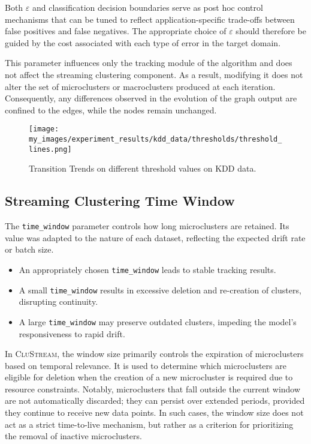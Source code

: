 Both $\varepsilon$ and classification decision boundaries serve as post hoc
control mechanisms that can be tuned to reflect application-specific trade-offs
between false positives and false negatives. The appropriate choice of
$\varepsilon$ should therefore be guided by the cost associated with each type of
error in the target domain.

This parameter influences only the tracking module of the algorithm and does
not affect the streaming clustering component. As a result, modifying it does
not alter the set of microclusters or macroclusters produced at each iteration.
Consequently, any differences observed in the evolution of the graph output are
confined to the edges, while the nodes remain unchanged.

\begin{figure}[H]
      \centering
      \texttt{[image: my\_images/experiment\_results/kdd\_data/thresholds/threshold\_lines.png]}
      \caption{Transition Trends on different threshold values on KDD data.}
\end{figure}

\subsection{Streaming Clustering Time Window}

The \texttt{time\_window} parameter controls how long microclusters are
retained. Its value was adapted to the nature of each dataset, reflecting the
expected drift rate or batch size.

\begin{itemize}
      \item An appropriately chosen \texttt{time\_window} leads to stable tracking results.
      \item A small \texttt{time\_window} results in excessive deletion and re-creation of
            clusters, disrupting continuity.
      \item A large \texttt{time\_window} may preserve outdated clusters, impeding the
            model's responsiveness to rapid drift.
\end{itemize}

In \textsc{CluStream}, the window size primarily controls the expiration of
microclusters based on temporal relevance. It is used to determine which
microclusters are eligible for deletion when the creation of a new microcluster
is required due to resource constraints. Notably, microclusters that fall
outside the current window are not automatically discarded; they can persist
over extended periods, provided they continue to receive new data points. In
such cases, the window size does not act as a strict time-to-live mechanism,
but rather as a criterion for prioritizing the removal of inactive
microclusters.

